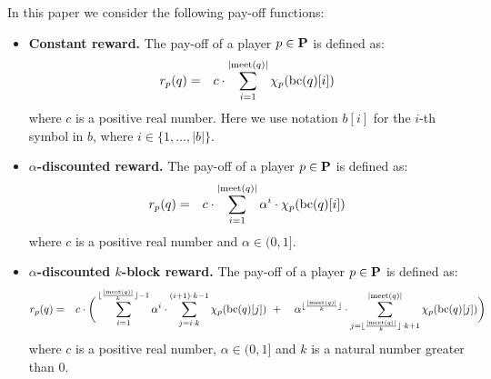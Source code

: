 In this paper we consider the following pay-off functions:
\begin{itemize}
\item {\bf Constant reward.} The pay-off of a player $p \in \mathbf{P}$ is defined as:
\begin{eqnarray*}
r_p(q) & = & 
{\displaystyle c \cdot \sum_{i=1}^{|\text{\rm meet}(q)|} \chi_p(\text{bc}(q)[i])} 
\end{eqnarray*}
where $c$ is a positive real number. Here we use notation $b[i]$ for the $i$-th symbol in $b$, where $i \in \{1, \ldots, |b|\}$. 

\item {\bf $\alpha$-discounted reward.} The pay-off of a player $p \in \mathbf{P}$ is defined as:
\begin{eqnarray*}
r_p(q) & = & 
{\displaystyle c \cdot \sum_{i=1}^{|\text{\rm meet}(q)|} \alpha^i \cdot \chi_p(\text{bc}(q)[i])} \end{eqnarray*}
where $c$ is a positive real number and $\alpha \in (0,1]$.

\item {\bf $\alpha$-discounted $k$-block reward.} The pay-off of a player $p \in \mathbf{P}$ is defined as:
\begin{eqnarray*}
r_p(q) & = & 
{\displaystyle c \cdot \bigg(
\sum_{i=1}^{\lfloor\frac{|\text{\rm meet}(q)|}{k}\rfloor-1}
\alpha^i \cdot \sum_{j=i \cdot k}^{(i+1) \cdot k -1} \chi_p(\text{bc}(q)[j])
\ +\hspace{10pt} \alpha^{\lfloor\frac{|\text{\rm meet}(q)|}{k}\rfloor} \cdot \sum_{j= \lfloor\frac{|\text{\rm meet}(q)|}{k}\rfloor \cdot k + 1}^{|\text{\rm meet}(q)|}  \chi_p(\text{bc}(q)[j])\bigg)}
\end{eqnarray*}
where $c$ is a positive real number, $\alpha \in (0,1]$ and $k$ is a natural number greater than 0.
\end{itemize}








